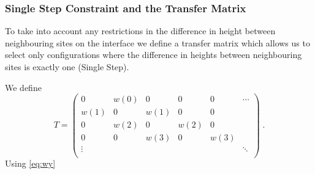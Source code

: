 \documentclass[a4paper,10pt]{article}
\begin{document}
\subsubsection{Single Step Constraint and the Transfer Matrix}

To take into account any restrictions in the difference in height between neighbouring sites on the interface we define a transfer matrix which allows us to select only configurations where the difference in heights between neighbouring sites is exactly one (Single Step). 

We define
\begin{equation}
  T = \begin{pmatrix}
       0      & w(0)   & 0      & 0      & 0      & \cdots \\
       w(1)   & 0      & w(1)   & 0      & 0      &        \\
       0      & w(2)   & 0      & w(2)   & 0      &        \\
       0      & 0      & w(3)   & 0      & w(3)   &        \\
       \vdots &        &        &        &        & \ddots \\
      \end{pmatrix} \;.
\end{equation}
Using \eqref{eq:wy}
\end{document}
